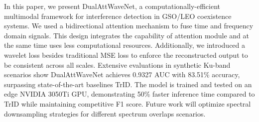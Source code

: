 \documentclass[conference]{IEEEtran}
\begin{document}
In this paper, we present DualAttWaveNet, a computationally-efficient multimodal framework for interference detection in GSO/LEO coexistence systems. We used a bidirectional attention mechanism to fuse time and frequency domain signals. This design integrates the capability of attention module and at the same time uses less computational resources. Additionally, we introduced a wavelet loss besides traditional MSE loss to enforce the reconstructed output to be consistent across all scales. Extensive evaluations in synthetic Ku-band scenarios show DualAttWaveNet achieves 0.9327 AUC with 83.51\% accuracy, surpassing state-of-the-art baselines TrID. The model is trained and tested on an edge NVIDIA 3050Ti GPU, demonstrating 50\% faster inference time compared to TrID while maintaining competitive F1 score. Future work will optimize spectral downsampling strategies for different spectrum overlaps scenarios.



\end{document}
